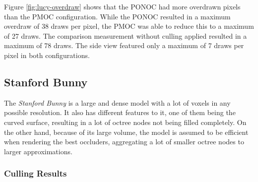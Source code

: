 \noindent
Figure \ref{fig:lucy-overdraw} shows that the \ac{PONOC} had more overdrawn pixels than the \ac{PMOC} configuration. 
While the \ac{PONOC} resulted in a maximum overdraw of 38 draws per pixel, the \ac{PMOC} was able to reduce this to 
a maximum of 27 draws. The comparison measurement without culling applied resulted in a maximum of 78 draws. The 
side view featured only a maximum of 7 draws per pixel in both configurations. 


\clearpage



\subsection*{Stanford Bunny}

The \emph{Stanford Bunny} is a large and dense model with a lot of voxels in any possible resolution.
It also has different features to it, one of them being the curved surface, resulting in a lot of octree 
nodes not being filled completely. On the other hand, because of its large volume, the model is assumed 
to be efficient when rendering the best occluders, aggregating a lot of smaller octree nodes to larger 
approximations.

\subsubsection*{Culling Results} \label{subsubsec-culling-results-bunny}


